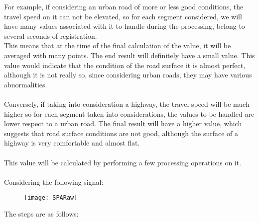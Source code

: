 \documentclass[tesi]{subfiles}
\begin{document}
\noindent For example, if considering an urban road of more or less good conditions, the travel speed on it can not be elevated, so for each segment considered, we will have many values associated with it to handle during the processing, belong to several seconds of registration.\\
\noindent This means that at the time of the final calculation of the value, it will be averaged with many points. The end result will definitely have a small value. This value would indicate that the condition of the road surface it is almost perfect, although it is not really so, since considering urban roads, they may have various abnormalities.\\\\
\noindent Conversely, if taking into consideration a highway, the travel speed will be much higher so for each segment taken into considerations, the values to be handled are lower respect to a urban road. The final result will have a higher value, which suggests that road surface conditions are not good, although the surface of a highway is very comfortable and almost flat.\\\\
\noindent This value will be calculated by performing a few processing operations on it.\\\\


\noindent Considering the following signal:
\begin{figure}[H]
\centering
\texttt{[image: SPARaw]}
\end{figure}

\noindent The steps are as follows:
\end{document}

